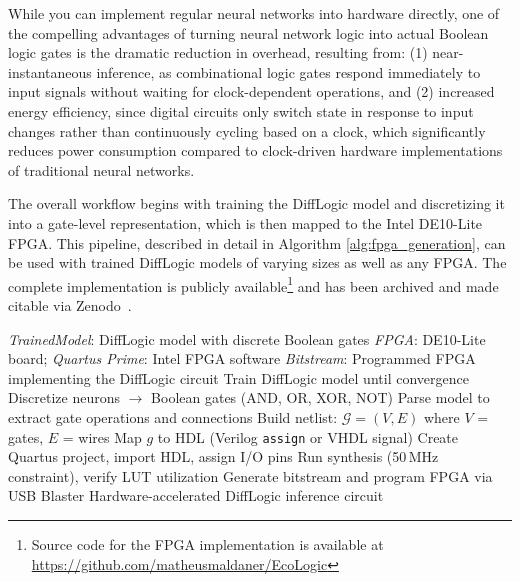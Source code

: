 While you can implement regular neural networks into hardware directly, one of the compelling advantages of turning neural network logic into actual Boolean logic gates is the dramatic reduction in overhead, resulting from: (1) near-instantaneous inference, as combinational logic gates respond immediately to input signals without waiting for clock-dependent operations, and (2) increased energy efficiency, since digital circuits only switch state in response to input changes rather than continuously cycling based on a clock, which significantly reduces power consumption compared to clock-driven hardware implementations of traditional neural networks.

The overall workflow begins with training the DiffLogic model and discretizing it into a gate-level representation, which is then mapped to the Intel DE10-Lite FPGA. This pipeline, described in detail in Algorithm \ref{alg:fpga_generation}, can be used with trained DiffLogic models of varying sizes as well as any FPGA. The complete implementation is publicly available\footnote{Source code for the FPGA implementation is available at \url{https://github.com/matheusmaldaner/EcoLogic}} and has been archived and made citable via Zenodo~\cite{maldaner2025ecologic}.

\begin{algorithm}[H]
\caption{Hardware Synthesis Pipeline for DiffLogic Models}
\label{alg:fpga_generation}
\begin{algorithmbox}
\begin{algorithmic}[1]
\Require \textit{TrainedModel}: DiffLogic model with discrete Boolean gates
\Require \textit{FPGA}: DE10-Lite board; \textit{Quartus Prime}: Intel FPGA software
\Ensure \textit{Bitstream}: Programmed FPGA implementing the DiffLogic circuit
\State Train DiffLogic model until convergence
\State Discretize neurons $\rightarrow$ Boolean gates (AND, OR, XOR, NOT)
\State Parse model to extract gate operations and connections
\State Build netlist: $\mathcal{G} = (V, E)$ where $V$ = gates, $E$ = wires
        \State Map $g$ to HDL (Verilog \texttt{assign} or VHDL signal)
    \EndFor
\EndFor
{}
\State Create Quartus project, import HDL, assign I/O pins
\State Run synthesis (50\,MHz constraint), verify LUT utilization
\State Generate bitstream and program FPGA via USB Blaster
\State \Return Hardware-accelerated DiffLogic inference circuit
\end{algorithmic}
\end{algorithmbox}
\end{algorithm}

